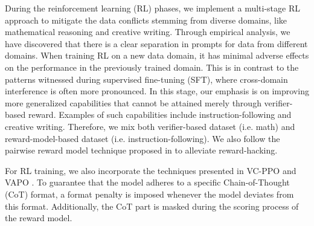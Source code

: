 During the reinforcement learning (RL) phases, we implement a multi-stage RL approach to mitigate the data conflicts stemming from diverse domains, like mathematical reasoning and creative writing. Through empirical analysis, we have discovered that there is a clear separation in prompts for data from different domains. When training RL on a new data domain, it has minimal adverse effects on the performance in the previously trained domain. This is in contrast to the patterns witnessed during supervised fine-tuning (SFT), where cross-domain interference is often more pronounced.
In this stage, our emphasis is on improving more generalized capabilities that cannot be attained merely through verifier-based reward. Examples of such capabilities include instruction-following and creative writing. Therefore, we mix both verifier-based dataset (i.e. math) and reward-model-based dataset (i.e. instruction-following). We also follow the pairwise reward model technique proposed in \citep{qrl} to alleviate reward-hacking.

For RL training, we also incorporate the techniques presented in VC-PPO \citep{yuan2025s} and VAPO \citep{vapo}. To guarantee that the model adheres to a specific Chain-of-Thought (CoT) format, a format penalty is imposed whenever the model deviates from this format. Additionally, the CoT part is masked during the scoring process of the reward model. 




